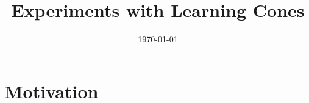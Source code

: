 \documentclass{article}
\title{Experiments with Learning Cones}
\date{\today}
\begin{document}
\maketitle





\section{Motivation}












\end{document}

